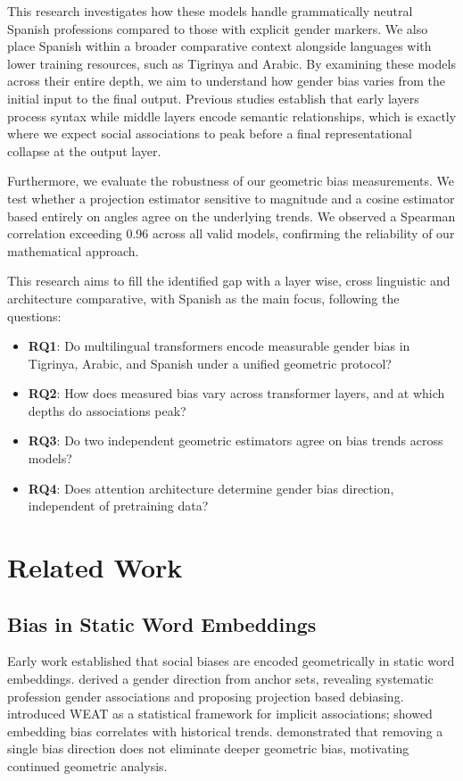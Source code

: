 \documentclass[english, a4paper, 11.5pt, twoside]{article}
\begin{document}
This research investigates how these models handle grammatically neutral Spanish professions compared to those with explicit gender markers. We also place Spanish within a broader comparative context alongside languages with lower training resources, such as Tigrinya and Arabic. By examining these models across their entire depth, we aim to understand how gender bias varies from the initial input to the final output. Previous studies establish that early layers process syntax while middle layers encode semantic relationships, which is exactly where we expect social associations to peak before a final representational collapse at the output layer.

Furthermore, we evaluate the robustness of our geometric bias measurements. We test whether a projection estimator sensitive to magnitude and a cosine estimator based entirely on angles agree on the underlying trends. We observed a Spearman correlation exceeding 0.96 across all valid models, confirming the reliability of our mathematical approach.

This research aims to fill the identified gap with a layer wise, cross linguistic and architecture comparative, with Spanish as the main focus, following the questions:
\begin{itemize}
    \item \textbf{RQ1}: Do multilingual transformers encode measurable gender bias in Tigrinya, Arabic, and Spanish under a unified geometric protocol?
    \item \textbf{RQ2}: How does measured bias vary across transformer layers, and at which depths do associations peak?
    \item \textbf{RQ3}: Do two independent geometric estimators agree on bias trends across models?
    \item \textbf{RQ4}: Does attention architecture determine gender bias direction, independent of pretraining data?
\end{itemize}

\section{Related Work}\label{section-related-work}
\subsection{Bias in Static Word Embeddings}
Early work established that social biases are encoded geometrically in static word embeddings. \textcite{Bolukbasi:2016} derived a gender direction from anchor sets, revealing systematic profession gender associations and proposing projection based debiasing. \textcite{Caliskan:2017} introduced WEAT as a statistical
framework for implicit associations; \textcite{Garg:2018}  showed embedding bias correlates with historical
trends. \textcite{Gonen:2019} demonstrated that removing a single bias direction does not eliminate
deeper geometric bias, motivating continued geometric analysis.
\end{document}
